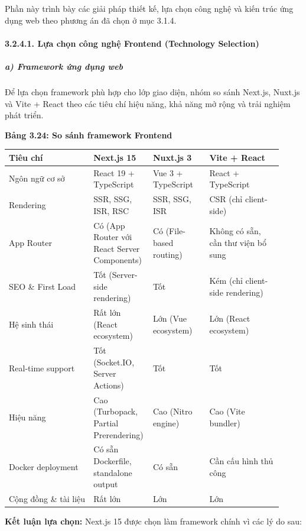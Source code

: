 \documentclass[13pt,a4paper]{extarticle}
\newcounter{none} %
\newcommand{\thesislongtableorignewline}{}
\let\thesislongtableorignewline\\
\renewcommand{\\}{\thesislongtableorignewline\hline}%
\let\\\thesislongtableorignewline
\newcommand{\thesistabletitle}[1]{%
  \begin{center}\textbf{#1}\end{center}%
}
\begin{document}
Phần này trình bày các giải pháp thiết kế, lựa chọn công nghệ và kiến
trúc ứng dụng web theo phương án đã chọn ở mục 3.1.4.

\paragraph{3.2.4.1. Lựa chọn công nghệ Frontend (Technology
Selection)}\label{3241-lux1ef1a-chux1ecdn-cuxf4ng-nghux1ec7-frontend-technology-selection}

\subparagraph{a) Framework ứng dụng
web}\label{a-framework-ux1ee9ng-dux1ee5ng-web}

Để lựa chọn framework phù hợp cho lớp giao diện, nhóm so sánh Next.js,
Nuxt.js và Vite + React theo các tiêu chí hiệu năng, khả năng mở rộng và
trải nghiệm phát triển.

\thesistabletitle{Bảng 3.24: So sánh framework Frontend}

{\def\LTcaptype{none} %
\begin{longtable}{|p{0.30\linewidth}|p{0.16\linewidth}|p{0.20\linewidth}|p{0.26\linewidth}|}
\hline \textbf{Tiêu chí} & \textbf{Next.js 15} & \textbf{Nuxt.js 3} & \textbf{Vite + React} \\
\hline
\endhead
\hline
\endlastfoot
Ngôn ngữ cơ sở & React 19 + TypeScript & Vue 3 + TypeScript & React +
TypeScript \\
Rendering & SSR, SSG, ISR, RSC & SSR, SSG, ISR & CSR (chỉ
client-side) \\
App Router & Có (App Router với React Server Components) & Có
(File-based routing) & Không có sẵn, cần thư viện bổ sung \\
SEO \& First Load & Tốt (Server-side rendering) & Tốt & Kém (chỉ
client-side rendering) \\
Hệ sinh thái & Rất lớn (React ecosystem) & Lớn (Vue ecosystem) & Lớn
(React ecosystem) \\
Real-time support & Tốt (Socket.IO, Server Actions) & Tốt & Tốt \\
Hiệu năng & Cao (Turbopack, Partial Prerendering) & Cao (Nitro engine) &
Cao (Vite bundler) \\
Docker deployment & Có sẵn Dockerfile, standalone output & Có sẵn & Cần
cấu hình thủ công \\
Cộng đồng \& tài liệu & Rất lớn & Lớn & Lớn \\
\end{longtable}
}

\textbf{Kết luận lựa chọn:} Next.js 15 được chọn làm framework chính vì
các lý do sau:
\end{document}
